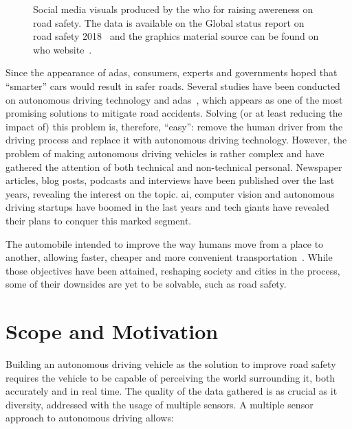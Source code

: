 \begin{figure}[H]
\begin{subfigure}[c]{0.3\textwidth}
		\label{fig:test_image_5}
	\end{subfigure}
	\caption{Social media visuals produced by the \acf{who} for raising awereness on road safety. The data is available on the Global status report on road safety 2018~\cite{WHO2018} and the graphics material source can be found on \ac{who} website~\cite{WHOsite}.}
	\label{fig:test_image}
\end{figure}

Since the appearance of \ac{adas}, consumers, experts and governments hoped that ``smarter'' cars would result in safer roads. Several studies have been conducted on autonomous driving technology and \ac{adas}~\cite{Fridman2017, ADAS1, Bimbraw2015}, which appears as one of the most promising solutions to mitigate road accidents. Solving (or at least reducing the impact of) this problem is, therefore, ``easy'': remove the human driver from the driving process and replace it with autonomous driving technology. However, the problem of making autonomous driving vehicles  is rather complex and have gathered the attention of both technical and non-technical personal. Newspaper articles, blog posts, podcasts and interviews have been published over the last years, revealing the interest on the topic. \ac{ai}, computer vision and autonomous driving startups have boomed in the last years and tech giants have revealed their plans to conquer this marked segment.

The automobile intended to improve the way humans move from a place to another, allowing faster, cheaper and more convenient transportation~\cite{Setright2003, DailyNews2013}. While those objectives have been attained, reshaping society and cities in the process, some of their downsides are yet to be solvable, such as road safety.


\section{Scope and Motivation}
\label{sec:introduction:scope_motivation}
Building an autonomous driving vehicle as the solution to improve road safety requires the vehicle to be capable of perceiving the world surrounding it, both accurately and in real time. The quality of the data gathered is as crucial as it diversity, addressed with the usage of multiple sensors. A multiple sensor approach to autonomous driving allows:


